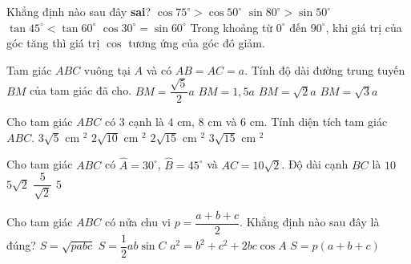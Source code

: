 \begin{ex}
	Khẳng định nào sau đây \textbf{sai}?
	\choice
	{\True $\cos 75^\circ >\cos 50^\circ $}
	{$\sin 80^\circ >\sin 50^\circ $}
	{$\tan 45^\circ <\tan 60^\circ $}
	{$\cos 30^\circ =\sin 60^\circ $}
	\loigiai
	{Trong khoảng từ $0^\circ$ đến $90^\circ$, khi giá trị của góc tăng thì giá trị $\cos$ tương ứng của góc đó giảm.}
\end{ex}
\begin{ex}
	Tam giác $ABC$ vuông tại $A$ và có $AB=AC=a$. Tính độ dài đường trung tuyến $BM$ của tam giác đã cho.
	\choice
	{\True $BM=\dfrac{\sqrt{5}}{2}a$}
	{$BM=1{,}5a$}
	{$BM=\sqrt{2}a$}
	{$BM=\sqrt{3}a$}
\end{ex}
\begin{ex}
	Cho tam giác $ABC$ có $3$ cạnh là $4$ cm, $8$ cm và $6$ cm. Tính diện tích tam giác $ABC$.
	\choice
	{$3\sqrt{5}$ cm $^2$}
	{$2\sqrt{10}$ cm $^2$}
	{$2\sqrt{15}$ cm $^2$}
	{\True $3\sqrt{15}$ cm $^2$}
\end{ex}
\begin{ex}
	Cho tam giác $ABC$ có $\widehat{A}=30^\circ$, $\widehat{B}=45^\circ$ và $AC=10\sqrt{2}$. Độ dài cạnh $BC$ là
	\choice
	{\True $10$}
	{$5\sqrt{2}$}
	{$\dfrac{5}{\sqrt{2}}$}
	{$5$}
\end{ex}
\begin{ex}
	Cho tam giác $ABC$ có nửa chu vi $p=\dfrac{a+b+c}{2}$. Khẳng định nào sau đây là đúng?
	\choice
	{$S=\sqrt{pabc}$}
	{\True $S=\dfrac12 ab \sin C$}
	{$a^2=b^2+c^2+2bc\cos A$}
	{$S=p(a+b+c)$}
\end{ex}
